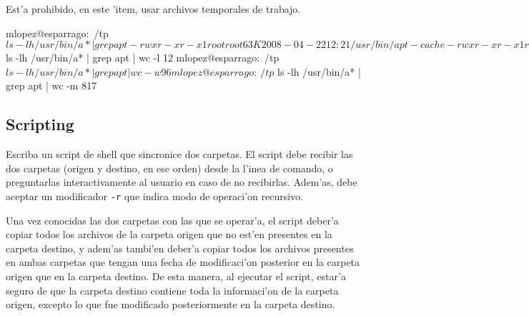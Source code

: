 \begin{enumerate}
\begin{enumerate}
Est'a prohibido, en este 'item, usar archivos temporales de trabajo.

\begin{envCodigo}
mlopez@esparrago:~/tp$ ls -lh /usr/bin/a* | grep apt
-rwxr-xr-x 1 root root  63K 2008-04-22 12:21 /usr/bin/apt-cache
-rwxr-xr-x 1 root root  18K 2008-04-22 12:21 /usr/bin/apt-cdrom
-rwxr-xr-x 1 root root 9.9K 2008-04-22 12:21 /usr/bin/apt-config
-rwxr-xr-x 1 root root  22K 2008-04-22 12:21 /usr/bin/apt-extracttemplates
-rwxr-xr-x 1 root root 187K 2008-04-22 12:21 /usr/bin/apt-ftparchive
-rwxr-xr-x 1 root root 139K 2008-04-22 12:21 /usr/bin/apt-get
-rwxr-xr-x 1 root root 2.2M 2008-04-04 06:56 /usr/bin/aptitude
-rwxr-xr-x 1 root root 1.9K 2008-04-04 06:56 /usr/bin/aptitude-create-state-bundle
-rwxr-xr-x 1 root root 3.0K 2008-04-04 06:56 /usr/bin/aptitude-run-state-bundle
-rwxr-xr-x 1 root root 5.0K 2008-04-22 12:20 /usr/bin/apt-key
-rwxr-xr-x 1 root root 2.2K 2008-04-22 12:20 /usr/bin/apt-mark
-rwxr-xr-x 1 root root  26K 2008-04-22 12:21 /usr/bin/apt-sortpkgs
mlopez@esparrago:~/tp$ ls -lh /usr/bin/a* | grep apt | wc -l
12
mlopez@esparrago:~/tp$ ls -lh /usr/bin/a* | grep apt | wc -w
96
mlopez@esparrago:~/tp$ ls -lh /usr/bin/a* | grep apt | wc -m
817
\end{envCodigo}

\end{enumerate}

\end{enumerate}

\subsection{Scripting}

Escriba un script de shell que sincronice dos carpetas. El script debe recibir las dos carpetas (origen y destino, en ese
orden) desde la l'inea de comando, o preguntarlas interactivamente al usuario en caso de no recibirlas. Adem'as, debe
aceptar un modificador \texttt{-r} que indica modo de operaci'on recursivo.

Una vez conocidas las dos carpetas con las que se operar'a, el script deber'a copiar todos los archivos de la carpeta origen
que no est'en presentes en la carpeta destino, y adem'as tambi'en deber'a copiar todos los archivos presentes en ambas
carpetas que tengan una fecha de modificaci'on posterior en la carpeta origen que en la carpeta destino. De esta manera, al
ejecutar el script, estar'a seguro de que la carpeta destino contiene toda la informaci'on de la carpeta origen, excepto lo
que fue modificado posteriormente en la carpeta destino.

